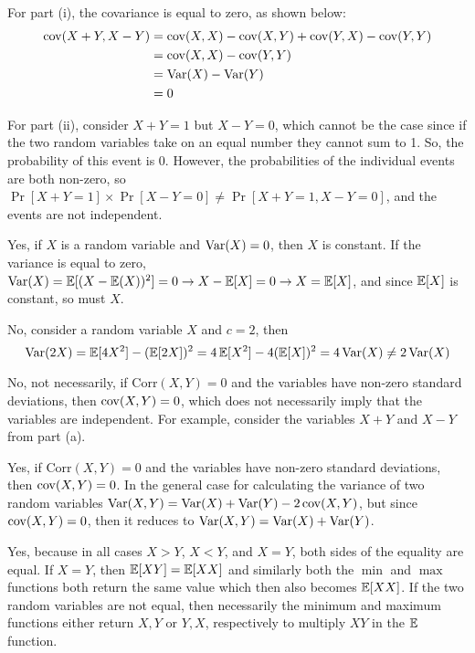 \documentclass[11pt]{article}
\begin{document}
\begin{solution}
	
\begin{Parts}
	
\Part For part (i), the covariance is equal to zero, as shown below:
\[
	\begin{split}
		\operatorname{cov}(X+Y, X-Y) &= \operatorname{cov}(X, X) - \operatorname{cov}(X, Y) + \operatorname{cov}(Y, X) - \operatorname{cov}(Y, Y) \\
		&= \operatorname{cov}(X, X) - \operatorname{cov}(Y, Y) \\
		&= \operatorname{Var}(X) - \operatorname{Var}(Y) \\
		&= 0
	\end{split}
\]

For part (ii), consider $X+Y=1$ but $X-Y=0$, which cannot be the case since if
the two random variables take on an equal number they cannot sum to 1. So, the
probability of this event is 0. However, the probabilities of the individual 
events are both non-zero, so $\Pr[X+Y=1] \times \Pr[X-Y=0] \neq \Pr[X+Y=1, X-Y=0]$,
and the events are not independent. 

\Part Yes, if $X$ is a random variable and $\operatorname{Var}(X) = 0$, then $X$ is constant. 
If the variance is equal to zero, $\operatorname{Var}(X) = \operatorname{\mathbb{E}}[(X-\operatorname{\mathbb{E}}(X))^2] = 0 \rightarrow 
X - \operatorname{\mathbb{E}}[X] = 0 \rightarrow X = \operatorname{\mathbb{E}}[X]$, and since $\operatorname{\mathbb{E}}[X]$ is constant, so must
$X$. 

\Part No, consider a random variable $X$ and $c=2$, then 
\[
	\operatorname{Var}(2X) = \operatorname{\mathbb{E}}[4X^2] - (\operatorname{\mathbb{E}}[2X])^2 = 4 \operatorname{\mathbb{E}}[X^2] - 4 (\operatorname{\mathbb{E}}[X])^2 = 4\operatorname{Var}(X) \neq 2\operatorname{Var}(X)
\]

\Part No, not necessarily, if $\text{Corr}(X, Y) = 0$ and the variables have
non-zero standard deviations, then $\operatorname{cov}(X,Y) = 0$, which does not necessarily
imply that the variables are independent. For example, consider the variables
$X+Y$ and $X-Y$ from part (a).

\Part Yes, if $\text{Corr}(X, Y) = 0$ and the variables have non-zero standard 
deviations, then $\operatorname{cov}(X,Y) = 0$. In the general case for calculating the 
variance of two random variables $\operatorname{Var}(X, Y) = \operatorname{Var}(X) + \operatorname{Var}(Y) - 2\operatorname{cov}(X, Y)$,
but since $\operatorname{cov}(X, Y) = 0$, then it reduces to $\operatorname{Var}(X, Y) = \operatorname{Var}(X) + \operatorname{Var}(Y)$.

\Part Yes, because in all cases $X > Y$, $X < Y$, and $X = Y$, both sides of the
equality are equal. If $X=Y$, then $\operatorname{\mathbb{E}}[XY] = \operatorname{\mathbb{E}}[XX]$ and similarly both the $\min$
and $\max$ functions both return the same value which then also becomes $\operatorname{\mathbb{E}}[XX]$. 
If the two random variables are not equal, then necessarily the minimum and maximum
functions either return $X, Y$ or $Y, X$, respectively to multiply $XY$ in the $\operatorname{\mathbb{E}}$ 
function. 


\end{Parts}
\end{solution}
\end{document}
